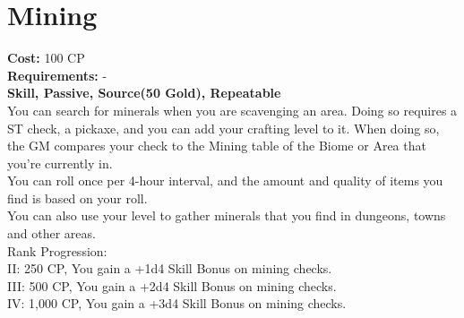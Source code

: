 \section{Mining}\label{perk:mining}
\textbf{Cost:} 100 CP\\
\textbf{Requirements:} -\\
\textbf{Skill, Passive, Source(50 Gold), Repeatable}\\
You can search for minerals when you are scavenging an area.
Doing so requires a ST check, a pickaxe, and you can add your crafting level to it.
When doing so, the GM compares your check to the Mining table of the Biome or Area that you're currently in.\\
You can roll once per 4-hour interval, and the amount and quality of items you find is based on your roll.\\
You can also use your level to gather minerals that you find in dungeons, towns and other areas.
\\
Rank Progression:\\
II: 250 CP, You gain a +1d4 Skill Bonus on mining checks.\\
III: 500 CP, You gain a +2d4 Skill Bonus on mining checks.\\
IV: 1,000 CP, You gain a +3d4 Skill Bonus on mining checks.\\